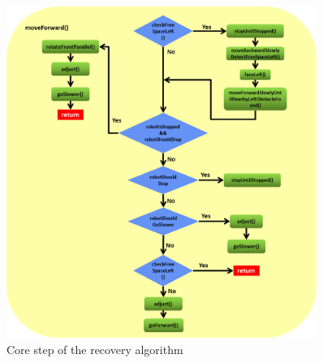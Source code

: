 \begin{figure}[htb]
\centering
\includegraphics[width=0.9\textwidth]{graphics/move_forward.png}
\caption{Core step of the recovery algorithm}
\label{move_forward}
\centering
\end{figure}


